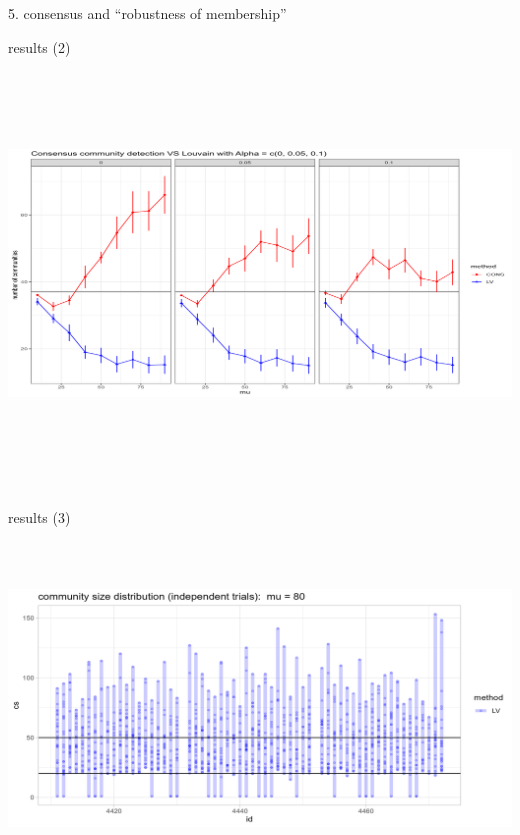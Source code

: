 \documentclass[
  ignorenonframetext,
]{beamer}
\begin{document}
\begin{frame}[fragile]{5. consensus and ``robustness of membership''}
\begin{block}{results (2)}
\protect\hypertarget{results-2-1}{}
\includegraphics[width=6.89583in,height=4.5in]{images/paste-F8669B18.png}
\end{block}

\begin{block}{results (3)}
\protect\hypertarget{results-3-1}{}
\includegraphics[width=5.94792in,height=3.77083in]{images/paste-657043E9.png}
\end{block}
\end{frame}
\end{document}
